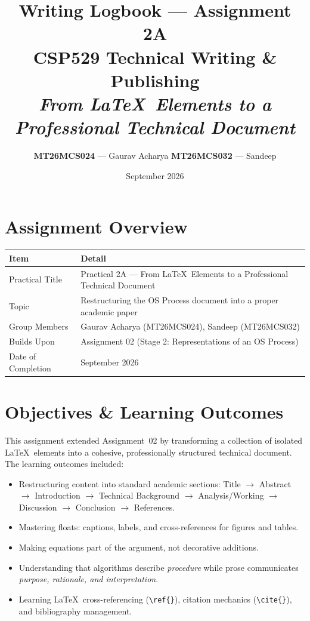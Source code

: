 \documentclass[11pt, a4paper]{article}
\title{
    \vspace{-1cm}
    \textbf{Writing Logbook --- Assignment 2A} \\[0.3em]
    \large CSP529 Technical Writing \& Publishing \\[0.2em]
    \large \textit{From \LaTeX\ Elements to a Professional Technical Document}
}
\author{
    \textbf{MT26MCS024} --- Gaurav Acharya \quad
    \textbf{MT26MCS032} --- Sandeep
}
\date{September 2026}
\begin{document}
\maketitle
\thispagestyle{fancy}

\section{Assignment Overview}

\begin{tabular}{@{}p{4.5cm} p{10cm}@{}}
    \toprule
    \textbf{Item} & \textbf{Detail} \\
    \midrule
    Practical Title & Practical 2A --- From \LaTeX\ Elements to a Professional Technical Document \\
    Topic & Restructuring the OS Process document into a proper academic paper \\
    Group Members & Gaurav Acharya (MT26MCS024), Sandeep (MT26MCS032) \\
    Builds Upon & Assignment 02 (Stage 2: Representations of an OS Process) \\
    Date of Completion & September 2026 \\
    \bottomrule
\end{tabular}

\section{Objectives \& Learning Outcomes}

This assignment extended Assignment~02 by transforming a collection of isolated \LaTeX\ elements into a cohesive, professionally structured technical document. The learning outcomes included:

\begin{itemize}[nosep]
    \item Restructuring content into standard academic sections: Title $\rightarrow$ Abstract $\rightarrow$ Introduction $\rightarrow$ Technical Background $\rightarrow$ Analysis/Working $\rightarrow$ Discussion $\rightarrow$ Conclusion $\rightarrow$ References.
    \item Mastering floats: captions, labels, and cross-references for figures and tables.
    \item Making equations part of the argument, not decorative additions.
    \item Understanding that algorithms describe \emph{procedure} while prose communicates \emph{purpose, rationale, and interpretation}.
    \item Learning \LaTeX\ cross-referencing (\texttt{\textbackslash ref\{\}}), citation mechanics (\texttt{\textbackslash cite\{\}}), and bibliography management.
\end{itemize}
\end{document}
